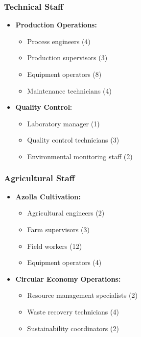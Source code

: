 \subsubsection{Technical Staff}
\begin{itemize}
    \item \textbf{Production Operations:}
    \begin{itemize}
        \item Process engineers (4)
        \item Production supervisors (3)
        \item Equipment operators (8)
        \item Maintenance technicians (4)
    \end{itemize}
    
    \item \textbf{Quality Control:}
    \begin{itemize}
        \item Laboratory manager (1)
        \item Quality control technicians (3)
        \item Environmental monitoring staff (2)
    \end{itemize}
\end{itemize}

\subsubsection{Agricultural Staff}
\begin{itemize}
    \item \textbf{Azolla Cultivation:}
    \begin{itemize}
        \item Agricultural engineers (2)
        \item Farm supervisors (3)
        \item Field workers (12)
        \item Equipment operators (4)
    \end{itemize}
    
    \item \textbf{Circular Economy Operations:}
    \begin{itemize}
        \item Resource management specialists (2)
        \item Waste recovery technicians (4)
        \item Sustainability coordinators (2)
    \end{itemize}
\end{itemize}


